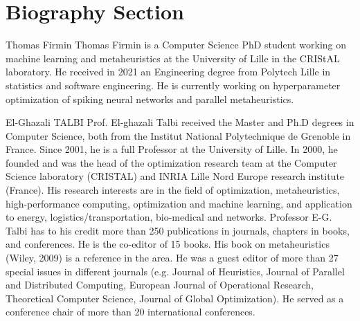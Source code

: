 \section{Biography Section}


\begin{IEEEbiography}{Thomas Firmin}
Thomas Firmin is a Computer Science PhD student working on machine learning and metaheuristics at the University of Lille in the CRIStAL laboratory. He received in 2021 an Engineering degree from Polytech Lille in statistics and software engineering. He is currently working on hyperparameter optimization of spiking neural networks and parallel metaheuristics.
\end{IEEEbiography}

\begin{IEEEbiography}{El-Ghazali TALBI}
Prof. El-ghazali Talbi received the Master and Ph.D degrees in Computer Science, both from the Institut National Polytechnique de Grenoble in France. Since 2001, he is a full Professor at the University of Lille. In 2000, he founded and was the head of the optimization research team at the Computer Science laboratory (CRISTAL) and INRIA Lille Nord Europe research institute (France). His research interests are in the field of optimization, metaheuristics, high-performance computing, optimization and machine learning, and application to energy, logistics/transportation, bio-medical and networks. Professor E-G. Talbi has to his credit more than 250 publications in journals, chapters in books, and conferences. He is the co-editor of 15 books. His book on metaheuristics (Wiley, 2009) is a reference in the area. He was a guest editor of more than 27 special issues in different journals (e.g. Journal of Heuristics, Journal of Parallel and Distributed Computing, European Journal of Operational Research, Theoretical Computer Science, Journal of Global Optimization). He served as a conference chair of more than 20 international conferences.
\end{IEEEbiography}